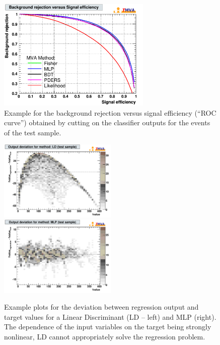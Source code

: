 \begin{figure}[t]
\begin{center}
  \includegraphics[width=0.65\textwidth]{plots/rejBvsS}
\end{center}
\vspace{-0.5cm}
\caption[.]{Example for the background rejection versus signal efficiency (``ROC curve'') obtained
            by cutting on the classifier outputs for the events of the test sample.
             }
\label{fig:usingtmva:rejBvsS}
\end{figure}
\begin{figure}[t]
\begin{center}
  \includegraphics[width=0.50\textwidth]{plots/deviation_LD_target_test_c0}
  \hspace{-0.3cm}
  \includegraphics[width=0.50\textwidth]{plots/deviation_MLP_target_test_c0}
  \vspace{0.2cm}
\end{center}
\vspace{-1.2cm}
\caption[.]{Example plots for the deviation between regression output and target values
            for a Linear Discriminant (LD -- left) and MLP (right). The dependence of the 
            input variables on the target being strongly nonlinear, LD cannot appropriately 
            solve the regression problem. }
\label{fig:usingtmva:deviation}
\end{figure}



